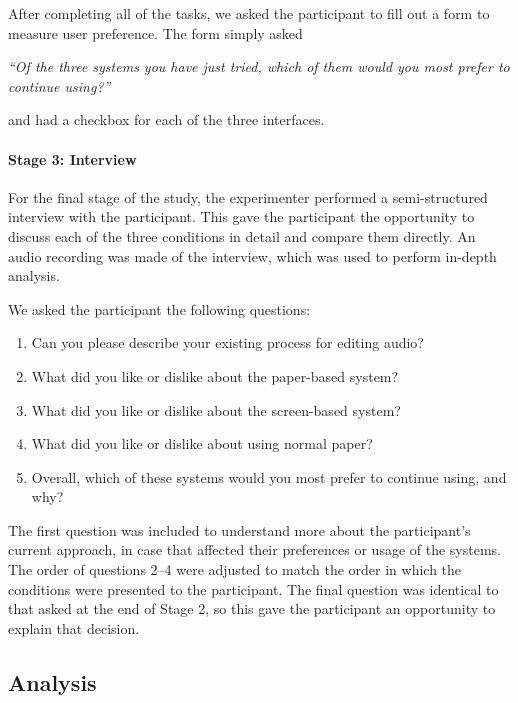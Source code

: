 After completing all of the tasks, we asked the participant to fill out a form to measure user preference. The form
simply asked

\textit{``Of the three systems you have just tried, which of them would you most prefer to continue
using?''}

and had a checkbox for each of the three interfaces.


\paragraph{Stage 3: Interview}

For the final stage of the study, the experimenter performed a semi-structured interview with the participant. This
gave the participant the opportunity to discuss each of the three conditions in detail and compare them directly. An
audio recording was made of the interview, which was used to perform in-depth analysis.

We asked the participant the following questions:

{\singlespacing
  \begin{enumerate}
    \item Can you please describe your existing process for editing audio?
    \item What did you like or dislike about the paper-based system?
    \item What did you like or dislike about the screen-based system?
    \item What did you like or dislike about using normal paper?
    \item Overall, which of these systems would you most prefer to continue using, and why?
  \end{enumerate}
}

The first question was included to understand more about the participant's current approach, in case that affected
their preferences or usage of the systems.  The order of questions 2--4 were adjusted to match the order in which the
conditions were presented to the participant.  The final question was identical to that asked at the end of Stage 2, so
this gave the participant an opportunity to explain that decision.

\subsection{Analysis}

